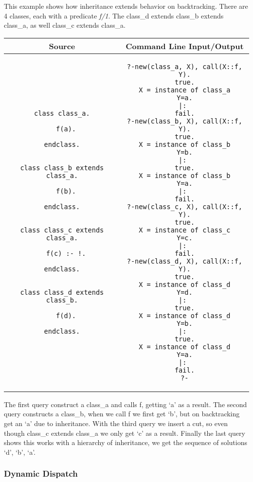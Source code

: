 \documentclass[12pt,a4paper,twoside,openright]{report}
\begin{document}
This example shows how inheritance extends behavior on backtracking. There are 4 classes, each with a predicate \emph{f/1}. The class_d extends class_b extends class_a, as well class_c extends class_a.
	\begin{center}
\begin{tabular}{c|c}
Source & Command Line Input/Output \\
\hline
	\small
\begin{lstlisting}
class class_a.

  f(a).
  
endclass.


class class_b extends class_a.

  f(b).
  
endclass.


class class_c extends class_a.

  f(c) :- !.
  
endclass.


class class_d extends class_b.

  f(d).
  
endclass.
\end{lstlisting}
&
	\small
\begin{lstlisting}
?-new(class_a, X), call(X::f, Y).
true.
X = instance of class_a
Y=a.
|: 
fail.
?-new(class_b, X), call(X::f, Y).
true.
X = instance of class_b
Y=b.
|: 
true.
X = instance of class_b
Y=a.
|: 
fail.
?-new(class_c, X), call(X::f, Y).
true.
X = instance of class_c
Y=c.
|: 
fail.
?-new(class_d, X), call(X::f, Y).
true.
X = instance of class_d
Y=d.
|: 
true.
X = instance of class_d
Y=b.
|: 
true.
X = instance of class_d
Y=a.
|: 
fail.
?-
\end{lstlisting}
\\
\end{tabular}
\end{center}

The first query construct a class_a and calls f, getting `a' as a result. The second query constructs a class_b, when we call f we first get `b', but on backtracking get an `a' due to inheritance. With the third query we insert a cut, so even though class_c extends class_a we only get `c' as a result. Finally the last query shows this works with a hierarchy of inheritance, we get the sequence of solutions `d', `b', `a'. 

	\subsubsection {Dynamic Dispatch}
	
\end{document}
